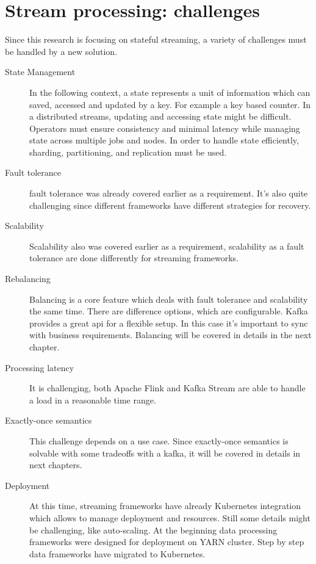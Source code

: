 \newpage
\section{Stream processing: challenges}\label{sec:-challanges}
Since this research is focusing on stateful streaming,
a variety of challenges must be handled by a new solution.

\begin{description}
    \item[State Management] In the following context, a state represents a unit of information
    which can saved, accessed and updated by a key.
    For example a key based counter.
    In a distributed streams,
    updating and accessing state might be difficult.
    Operators must ensure consistency and minimal latency while managing
    state across multiple jobs and nodes.
    In order to handle state efficiently, sharding, partitioning,
    and replication must be used.
    \item[Fault tolerance] fault tolerance was already covered earlier as a requirement.
    It's also quite challenging since different frameworks have different strategies for 
    recovery.
    \item[Scalability] Scalability also was covered earlier as a requirement, scalability
    as a fault tolerance are done differently for streaming frameworks.
    \item[Rebalancing] Balancing is a core feature which deals with fault tolerance
    and scalability the same time.
    There are difference options, which are configurable.
    Kafka provides a great api for a flexible setup.
    In this case it's important to sync with business requirements.
    Balancing will be covered in details in the next chapter.
    \item [Processing latency] It is challenging, both Apache Flink and Kafka Stream are able
    to handle a load in a reasonable time range.
    \item[Exactly-once semantics] This challenge depends on a use case.
    Since exactly-once semantics is solvable with some tradeoffs  with a kafka, it
    will be covered in details in next chapters.
    \item[Deployment] At this time, streaming frameworks have already Kubernetes
    integration which allows to manage deployment and resources.
    Still some details might be challenging, like auto-scaling.
    At the beginning data processing frameworks were designed for deployment
    on YARN cluster.
    Step by step data frameworks have migrated to Kubernetes.
\end{description}

